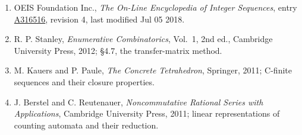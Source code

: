 \documentclass[11pt]{article}
\theoremstyle{definition}
\begin{document}
\begin{enumerate}

\item OEIS Foundation Inc., \emph{The On-Line Encyclopedia of Integer Sequences}, entry \href{https://oeis.org/A316516}{A316516}, revision 4, last modified Jul 05 2018.

\item R. P. Stanley, \emph{Enumerative Combinatorics}, Vol.~1, 2nd ed., Cambridge University Press, 2012; \S4.7, the transfer-matrix method.

\item M. Kauers and P. Paule, \emph{The Concrete Tetrahedron}, Springer, 2011; C-finite sequences and their closure properties.

\item J. Berstel and C. Reutenauer, \emph{Noncommutative Rational Series with Applications}, Cambridge University Press, 2011; linear representations of counting automata and their reduction.

\end{enumerate}
\end{document}

